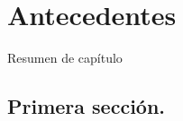 \chapter{Antecedentes}
\label{ch:backg}
Resumen de capítulo

\section{Primera sección.}
	\label{sec:recProbl}



